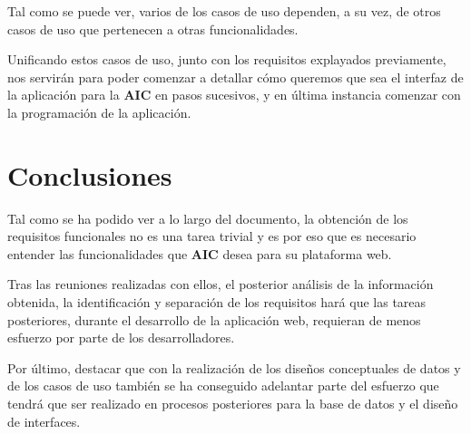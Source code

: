 \documentclass{\ClassPath/viu-tfm-template}
\begin{document}
Tal como se puede ver, varios de los casos de uso dependen, a su vez, de otros casos de uso que pertenecen a otras funcionalidades.

Unificando estos casos de uso, junto con los requisitos explayados previamente, nos servirán para poder comenzar a detallar cómo queremos que sea el interfaz de la aplicación para la \textbf{AIC} en pasos sucesivos, y en última instancia comenzar con la programación de la aplicación.



\chapter{Conclusiones}
Tal como se ha podido ver a lo largo del documento, la obtención de los requisitos funcionales no es una tarea trivial y es por eso que es necesario entender las funcionalidades que \textbf{AIC} desea para su plataforma web.

Tras las reuniones realizadas con ellos, el posterior análisis de la información obtenida, la identificación y separación de los requisitos hará que las tareas posteriores, durante el desarrollo de la aplicación web, requieran de menos esfuerzo por parte de los desarrolladores.

Por último, destacar que con la realización de los diseños conceptuales de datos y de los casos de uso también se ha conseguido adelantar parte del esfuerzo que tendrá que ser realizado en procesos posteriores para la base de datos y el diseño de interfaces.


\printbibliography[title={Referencias bibliográficas},heading=bibintoc]
\end{document}
